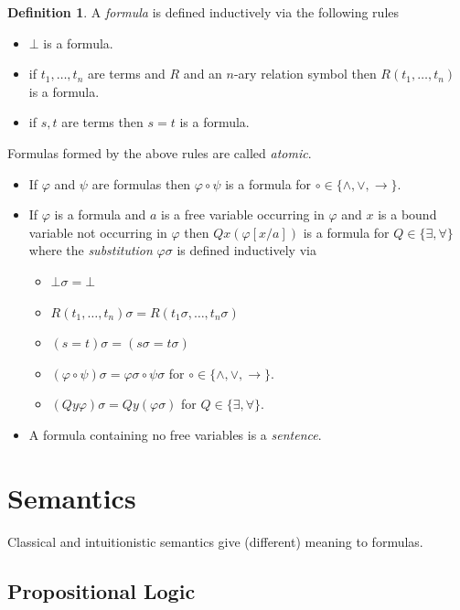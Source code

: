 \documentclass[a4paper,11pt]{report}
\theoremstyle{definition}
\theoremstyle{definition}
\theoremstyle{definition}
\theoremstyle{definition}
\theoremstyle{definition}
\newtheorem{definition}[theorem]{Definition}
\theoremstyle{definition}
\theoremstyle{definition}
\begin{document}
	\begin{definition}
		A \textit{formula} is defined inductively via the following rules
		\begin{itemize}
			\item $\bot$ is a formula.
			\item if $t_1,\dots,t_n$ are terms and $R$ and an $n$-ary relation symbol then $R(t_1, \dots, t_n)$ is a formula.
			\item if $s, t$ are terms then $s = t$ is a formula.
		\end{itemize}	
		Formulas formed by the above rules are called \textit{atomic}.
		\begin{itemize}
			\item If $\varphi$ and $\psi$ are formulas then $\varphi\circ\psi$ is a formula for $\circ\in\{\wedge,\vee,\to\}$.
			\item If $\varphi$ is a formula and $a$ is a free variable occurring in $\varphi$ and $x$ is a bound variable not occurring in $\varphi$ then $Qx(\varphi[x/a])$ is a formula for $Q\in\{\exists,\forall\}$ where the \textit{substitution} $\varphi\sigma$ is defined inductively via
			\begin{itemize}
				\item $\bot\sigma = \bot$
				\item $R(t_1,\dots,t_n)\sigma = R(t_1\sigma,\dots, t_n\sigma)$
				\item $(s = t)\sigma = (s\sigma = t\sigma)$
				\item $(\varphi\circ\psi)\sigma = \varphi\sigma\circ\psi\sigma$ for $\circ\in\{\wedge,\vee,\to\}$.
				\item $(Qy\varphi)\sigma = Qy(\varphi\sigma)$ for $Q\in\{\exists,\forall\}$.
			\end{itemize}
			\item A formula containing no free variables is a \textit{sentence}.
		\end{itemize}
	\end{definition}

	\section{Semantics}
	
	Classical and intuitionistic semantics give (different) meaning to formulas.
	
	\subsection{Propositional Logic}
\end{document}
